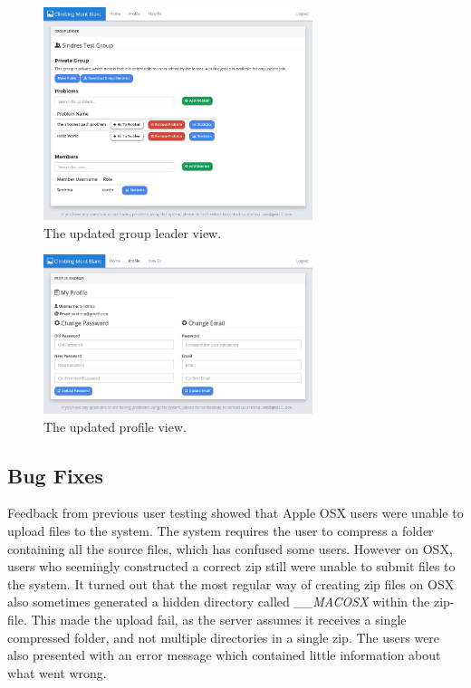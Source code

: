 \begin{figure}[h!]
    \centering
    \includegraphics[width=0.7\textwidth]{figs/new_leader.jpg}
    \caption[The updated group leader view]{The updated group leader view.}
    \label{fig:new-leader}
\end{figure}

\begin{figure}[h!]
    \centering
    \includegraphics[width=0.7\textwidth]{figs/new_profile.jpg}
    \caption[The updated profile view]{The updated profile view.}
    \label{fig:new-profile}
\end{figure}

\subsection{Bug Fixes}
Feedback from previous user testing showed that Apple OSX users were unable to upload files to the system. The system requires the user to compress a folder containing all the source files, which has confused some users. However on OSX, users who seemingly constructed a correct zip still were unable to submit files to the system. It turned out that the most regular way of creating zip files on OSX also sometimes generated a hidden directory called \textit{\_\_MACOSX} within the zip-file. This made the upload fail, as the server assumes it receives a single compressed folder, and not multiple directories in a single zip. The users were also presented with an error message which contained little information about what went wrong. \\

